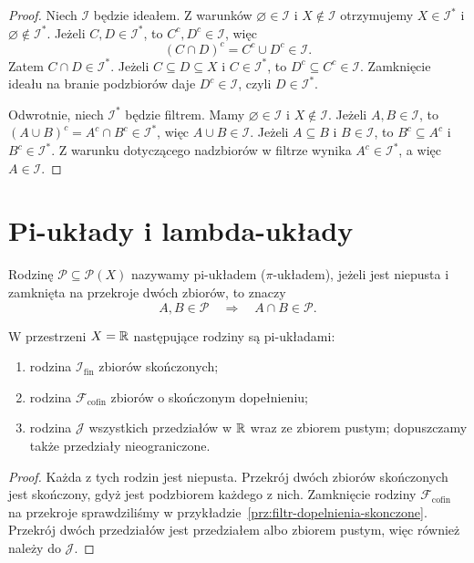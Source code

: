 \begin{proof}
Niech $\mathcal{I}$ będzie ideałem. Z warunków
$\varnothing\in\mathcal{I}$ i $X\notin\mathcal{I}$ otrzymujemy
$X\in\mathcal{I}^{\ast}$ i $\varnothing\notin\mathcal{I}^{\ast}$.
Jeżeli $C,D\in\mathcal{I}^{\ast}$, to $C^c,D^c\in\mathcal{I}$, więc
\[
  (C\cap D)^c=C^c\cup D^c\in\mathcal{I}.
\]
Zatem $C\cap D\in\mathcal{I}^{\ast}$.
Jeżeli $C\subseteq D\subseteq X$ i $C\in\mathcal{I}^{\ast}$,
to $D^c\subseteq C^c\in\mathcal{I}$. Zamknięcie ideału na branie
podzbiorów daje $D^c\in\mathcal{I}$, czyli $D\in\mathcal{I}^{\ast}$.

Odwrotnie, niech $\mathcal{I}^{\ast}$ będzie filtrem.
Mamy $\varnothing\in\mathcal{I}$ i $X\notin\mathcal{I}$.
Jeżeli $A,B\in\mathcal{I}$, to
$(A\cup B)^c=A^c\cap B^c\in\mathcal{I}^{\ast}$,
więc $A\cup B\in\mathcal{I}$.
Jeżeli $A\subseteq B$ i $B\in\mathcal{I}$, to
$B^c\subseteq A^c$ i $B^c\in\mathcal{I}^{\ast}$.
Z warunku dotyczącego nadzbiorów w filtrze wynika
$A^c\in\mathcal{I}^{\ast}$, a więc $A\in\mathcal{I}$.
\end{proof}

\section{Pi-układy i lambda-układy}
\label{sec:pi-lambda-uklady}

\begin{definicja}[Pi-układ]
\label{def:pi-uklad}
Rodzinę $\mathcal{P}\subseteq\mathcal{P}(X)$ nazywamy pi-układem
($\pi$-układem), jeżeli jest niepusta i zamknięta na przekroje dwóch
zbiorów, to znaczy
\[
  A,B\in\mathcal{P}\quad\Longrightarrow\quad A\cap B\in\mathcal{P}.
\]
\end{definicja}

\begin{przyklad}
W przestrzeni $X=\mathbb{R}$ następujące rodziny są pi-układami:
\begin{enumerate}
  \item rodzina $\mathcal{I}_{\mathrm{fin}}$ zbiorów skończonych;
  \item rodzina $\mathcal{F}_{\mathrm{cofin}}$ zbiorów o skończonym dopełnieniu;
  \item rodzina $\mathcal{J}$ wszystkich przedziałów w $\mathbb{R}$ wraz
  ze zbiorem pustym; dopuszczamy także przedziały nieograniczone.
\end{enumerate}
\end{przyklad}

\begin{proof}
Każda z tych rodzin jest niepusta. Przekrój dwóch zbiorów skończonych
jest skończony, gdyż jest podzbiorem każdego z nich.
Zamknięcie rodziny $\mathcal{F}_{\mathrm{cofin}}$ na przekroje
sprawdziliśmy w przykładzie~\ref{prz:filtr-dopelnienia-skonczone}.
Przekrój dwóch przedziałów jest przedziałem albo zbiorem pustym,
więc również należy do $\mathcal{J}$.
\end{proof}


